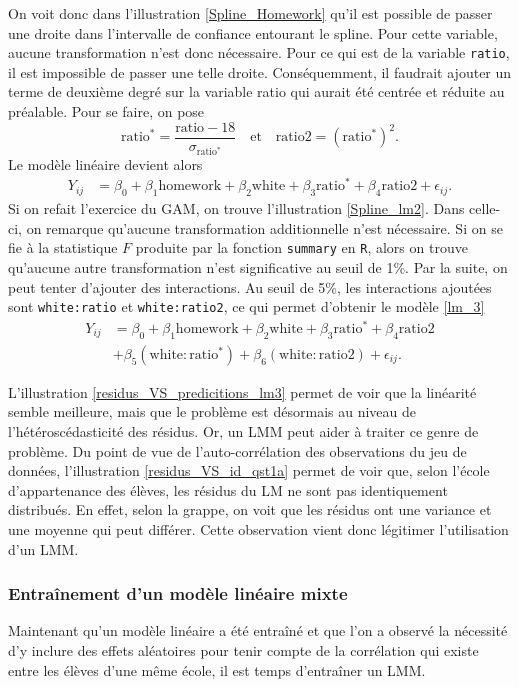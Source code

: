 \documentclass{article}
\begin{document}
		On voit donc dans l'illustration \ref{Spline_Homework} qu'il est possible de passer une droite dans l'intervalle de confiance entourant le spline. Pour cette variable, aucune transformation n'est donc nécessaire. Pour ce qui est de la variable \texttt{ratio}, il est impossible de passer une telle droite. Conséquemment, il faudrait ajouter un terme de deuxième degré sur la variable ratio qui aurait été centrée et réduite au préalable. Pour se faire, on pose
		$$ 
		\mathrm{ratio^*} = \frac{\mathrm{ratio}-18}{ \sigma_{\mathrm{ratio^*}}} 
		\quad\text{et}\quad
		\mathrm{ratio2} = (\mathrm{ratio^*})^2.
		$$
		Le modèle linéaire devient alors
		\begin{align}\label{lm_2}
				Y_{ij} &= \beta_0 + \beta_1 \mathrm{homework} + \beta_2 \mathrm{white} + \beta_3 \mathrm{ratio^*} + \beta_4 \mathrm{ratio2} + \epsilon_{ij}.
		\end{align}
		Si on refait l'exercice du GAM, on trouve l'illustration \ref{Spline_lm2}. Dans celle-ci, on remarque qu'aucune transformation additionnelle n'est nécessaire.
		Si on se fie à la statistique $F$ produite par la fonction \texttt{summary} en \texttt{R}, alors on trouve qu'aucune autre transformation n'est significative au seuil de 1\%. Par la suite, on peut tenter d'ajouter des interactions.
		Au seuil de 5\%, les interactions ajoutées sont \texttt{white:ratio} et \texttt{white:ratio2}, ce qui permet d'obtenir le modèle \eqref{lm_3}
		\begin{align}\label{lm_3}
			Y_{ij} &= \beta_0 + \beta_1 \mathrm{homework} + \beta_2 \mathrm{white} + \beta_3 \mathrm{ratio^*} + \beta_4 \mathrm{ratio2}\\
			 &+ \beta_5 (\mathrm{white:ratio^*}) + \beta_6 (\mathrm{white:ratio2}) + \epsilon_{ij}. \nonumber
		\end{align}
		
		L'illustration \ref{residus_VS_predicitions_lm3} permet de voir que la linéarité semble meilleure, mais que le problème est désormais au niveau de l'hétéroscédasticité des résidus. Or, un LMM peut aider à traiter ce genre de problème. Du point de vue de l'auto-corrélation des observations du jeu de données, l'illustration \ref{residus_VS_id_qst1a} permet de voir que, selon l'école d'appartenance des élèves, les résidus du LM ne sont pas identiquement distribués. En effet, selon la grappe, on voit que les résidus ont une variance et une moyenne qui peut différer. Cette observation vient donc légitimer l'utilisation d'un LMM.
		
	\subsubsection*{Entraînement d'un modèle linéaire mixte}
		Maintenant qu'un modèle linéaire a été entraîné et que l'on a observé la nécessité d'y inclure des effets aléatoires pour tenir compte de la corrélation qui existe entre les élèves d'une même école, il est temps d'entraîner un LMM.\\
		
\end{document}
